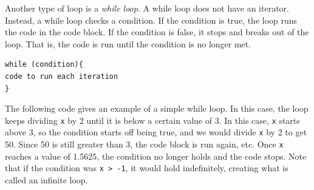 \documentclass[
  letterpaper,
]{latex/krantz}
\makeatletter
\newenvironment{Shaded}{\begin{snugshade}}{\end{snugshade}}
\newcommand{\AttributeTok}[1]{\textcolor[rgb]{0.40,0.45,0.13}{#1}}
\newcommand{\CommentTok}[1]{\textcolor[rgb]{0.37,0.37,0.37}{#1}}
\newcommand{\ControlFlowTok}[1]{\textcolor[rgb]{0.00,0.23,0.31}{#1}}
\newcommand{\DecValTok}[1]{\textcolor[rgb]{0.68,0.00,0.00}{#1}}
\newcommand{\FunctionTok}[1]{\textcolor[rgb]{0.28,0.35,0.67}{#1}}
\newcommand{\NormalTok}[1]{\textcolor[rgb]{0.00,0.23,0.31}{#1}}
\newcommand{\OtherTok}[1]{\textcolor[rgb]{0.00,0.23,0.31}{#1}}
\newcommand{\SpecialCharTok}[1]{\textcolor[rgb]{0.37,0.37,0.37}{#1}}
\newenvironment{kframe}{%
\medskip{}
\setlength{\fboxsep}{.8em}
 \def\at@end@of@kframe{}%
 \ifinner\ifhmode%
  \def\at@end@of@kframe{\end{minipage}}%
  \begin{minipage}{\columnwidth}%
 \fi\fi%
 \def\FrameCommand##1{\hskip\@totalleftmargin \hskip-\fboxsep
 \colorbox{shadecolor}{##1}\hskip-\fboxsep
     \hskip-\linewidth \hskip-\@totalleftmargin \hskip\columnwidth}%
 \MakeFramed {\advance\hsize-\width
   \@totalleftmargin\z@ \linewidth\hsize
   \@setminipage}}%
 {\par\unskip\endMakeFramed%
 \at@end@of@kframe}
\renewenvironment{Shaded}{\begin{kframe}}{\end{kframe}}
\makeatother
\begin{document}
\begin{Shaded}
\end{Shaded}

Another type of loop is a \emph{while loop}. A
while loop does not have an iterator. Instead, a while loop checks a
condition. If the condition is true, the loop runs the code in the code
block. If the condition is false, it stops and breaks out of the loop.
That is, the code is run until the condition is no longer met.

\begin{verbatim}
while (condition){
code to run each iteration
}
\end{verbatim}

The following code gives an example of a simple while loop. In this
case, the loop keeps dividing \texttt{x} by 2 until it is below a
certain value of 3. In this case, \texttt{x} starts above 3, so the
condition starts off being true, and we would divide \texttt{x} by 2 to
get 50. Since 50 is still greater than 3, the code block is run again,
etc. Once \texttt{x} reaches a value of 1.5625, the condition no longer
holds and the code stops. Note that if the condition was
\texttt{x\ \textgreater{}\ -1}, it would hold indefinitely, creating
what is called an infinite loop.
\end{document}
